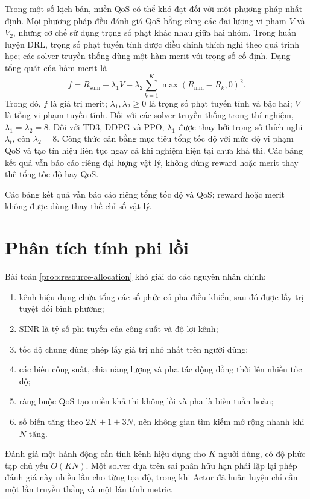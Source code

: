 Trong một số kịch bản, miền QoS có thể khó đạt đối với một phương pháp nhất định. Mọi phương pháp đều đánh giá QoS bằng cùng các đại lượng vi phạm $V$ và $V_2$, nhưng cơ chế sử dụng trọng số phạt khác nhau giữa hai nhóm. Trong huấn luyện DRL, trọng số phạt tuyến tính được điều chỉnh thích nghi theo quá trình học; các solver truyền thống dùng một hàm merit với trọng số cố định. Dạng tổng quát của hàm merit là
\begin{equation}
 f=R_{\mathrm{sum}}-\lambda_1V-\lambda_2\sum_{k=1}^{K}\max(R_{\min}-R_k,0)^2.
 \label{eq:merit-ch2}
\end{equation}
Trong đó, $f$ là giá trị merit; $\lambda_1,\lambda_2\ge0$ là trọng số phạt tuyến tính và bậc hai; $V$ là tổng vi phạm tuyến tính. Đối với các solver truyền thống trong thí nghiệm, $\lambda_1=\lambda_2=8$. Đối với TD3, DDPG và PPO, $\lambda_1$ được thay bởi trọng số thích nghi $\lambda_t$, còn $\lambda_2=8$. Công thức cân bằng mục tiêu tổng tốc độ với mức độ vi phạm QoS và tạo tín hiệu liên tục ngay cả khi nghiệm hiện tại chưa khả thi. Các bảng kết quả vẫn báo cáo riêng đại lượng vật lý, không dùng reward hoặc merit thay thế tổng tốc độ hay QoS.

Các bảng kết quả vẫn báo cáo riêng tổng tốc độ và QoS; reward hoặc merit không được dùng thay thế chỉ số vật lý.

\section{Phân tích tính phi lồi}
Bài toán \eqref{prob:resource-allocation} khó giải do các nguyên nhân chính:
\begin{enumerate}[label=\arabic*)]
  \item kênh hiệu dụng chứa tổng các số phức có pha điều khiển, sau đó được lấy trị tuyệt đối bình phương;
  \item SINR là tỷ số phi tuyến của công suất và độ lợi kênh;
  \item tốc độ chung dùng phép lấy giá trị nhỏ nhất trên người dùng;
  \item các biến công suất, chia năng lượng và pha tác động đồng thời lên nhiều tốc độ;
  \item ràng buộc QoS tạo miền khả thi không lồi và pha là biến tuần hoàn;
  \item số biến tăng theo $2K+1+3N$, nên không gian tìm kiếm mở rộng nhanh khi $N$ tăng.
\end{enumerate}

Đánh giá một hành động cần tính kênh hiệu dụng cho $K$ người dùng, có độ phức tạp chủ yếu $O(KN)$. Một solver dựa trên sai phân hữu hạn phải lặp lại phép đánh giá này nhiều lần cho từng tọa độ, trong khi Actor đã huấn luyện chỉ cần một lần truyền thẳng và một lần tính metric.

